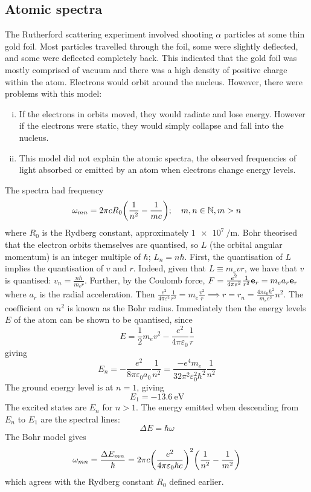 \subsection{Atomic spectra}
The Rutherford scattering experiment involved shooting \( \alpha \) particles at some thin gold foil.
Most particles travelled through the foil, some were slightly deflected, and some were deflected completely back.
This indicated that the gold foil was mostly comprised of vacuum and there was a high density of positive charge within the atom.
Electrons would orbit around the nucleus.
However, there were problems with this model:
\begin{enumerate}[(i)]
	\item If the electrons in orbits moved, they would radiate and lose energy.
	      However if the electrons were static, they would simply collapse and fall into the nucleus.
	\item This model did not explain the atomic spectra, the observed frequencies of light absorbed or emitted by an atom when electrons change energy levels.
\end{enumerate}
The spectra had frequency
\[
	\omega_{mn} = 2 \pi c R_0 \qty(\frac{1}{n^2} - \frac{1}{mc}); \quad m, n \in \mathbb N, m > n
\]
where \( R_0 \) is the Rydberg constant, approximately \( \SI{1e7}{\per\metre} \).
Bohr theorised that the electron orbits themselves are quantised, so \( L \) (the orbital angular momentum) is an integer multiple of \( \hbar \); \( L_n = n \hbar \).
First, the quantisation of \( L \) implies the quantisation of \( v \) and \( r \).
Indeed, given that \( L \equiv m_e v r \), we have that \( v \) is quantised: \( v_n = \frac{n\hbar}{m_e r} \).
Further, by the Coulomb force, \( F = \frac{e^2}{4 \pi \varepsilon^2} \frac{1}{r^2} \vb e_r = m_e a_r \vb e_r \) where \( a_r \) is the radial acceleration.
Then \( \frac{e^2}{4 \pi \varepsilon^2} \frac{1}{r^2} = m_e \frac{v^2}{r} \implies r = r_n = \frac{4 \pi \varepsilon_0 \hbar^2}{m_e e^2} n^2 \).
The coefficient on \( n^2 \) is known as the Bohr radius.
Immediately then the energy levels \( E \) of the atom can be shown to be quantised, since
\[
	E = \frac{1}{2} m_e v^2 - \frac{e^2}{4 \pi \varepsilon_0} \frac{1}{r}
\]
giving
\[
	E_n = -\frac{e^2}{8 \pi \varepsilon_0 a_0} \frac{1}{n^2} = \frac{-e^4 m_e}{32 \pi^2 \varepsilon_0^2 \hbar^2} \frac{1}{n^2}
\]
The ground energy level is at \( n = 1 \), giving
\[
	E_1 = -\SI{13.6}{\eV}
\]
The excited states are \( E_n \) for \( n > 1 \).
The energy emitted when descending from \( E_n \) to \( E_1 \) are the spectral lines:
\[
	\Delta E = \hbar \omega
\]
The Bohr model gives
\[
	\omega_{mn} = \frac{\Delta E_{mn}}{\hbar} = 2 \pi c \qty( \frac{e^2}{4 \pi \varepsilon_0 \hbar c} )^2 \qty( \frac{1}{n^2} - \frac{1}{m^2} )
\]
which agrees with the Rydberg constant \( R_0 \) defined earlier.
